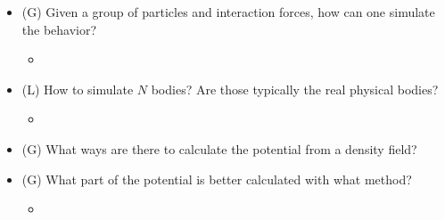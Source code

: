 \begin{itemize}
    \item (G) Given a group of particles and interaction forces, how can one simulate the behavior?
    \begin{itemize}
        \item {}
    \end{itemize}
    \answerboxS
    \item (L) How to simulate $N$ bodies? Are those typically the real physical bodies?
    \begin{itemize}
        \item {}
    \end{itemize}
    \answerboxM
    \item (G) What ways are there to calculate the potential from a density field?
    \answerboxM
    \item (G) What part of the potential is better calculated with what method?
    \begin{itemize}
        \item {}
    \end{itemize}
    \answerboxM
\end{itemize}

